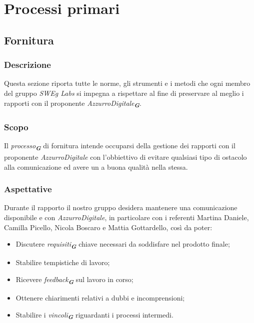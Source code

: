 

\section{Processi primari}
\label{sec:processi_primari}

\subsection{Fornitura}

\subsubsection{Descrizione}
Questa sezione riporta tutte le norme, gli strumenti e i metodi che ogni membro del gruppo \emph{SWEg Labs} si impegna a rispettare al fine di preservare al meglio i rapporti con il proponente \emph{AzzurroDigitale}\textsubscript{\textit{\textbf{G}}}.

\subsubsection{Scopo}
Il \emph{processo}\textsubscript{\textit{\textbf{G}}} di fornitura intende occuparsi della gestione dei rapporti con il proponente \emph{AzzurroDigitale} con l’obbiettivo di evitare qualsiasi tipo di ostacolo alla comunicazione ed avere un a buona qualità nella stessa.

\subsubsection{Aspettative}
Durante il rapporto il nostro gruppo desidera mantenere una comunicazione disponibile e con \emph{AzzurroDigitale}, in particolare con i referenti Martina Daniele, Camilla Picello, Nicola Boscaro e Mattia Gottardello, così da poter:
\begin{itemize}
    \item Discutere \emph{requisiti}\textsubscript{\textit{\textbf{G}}} chiave necessari da soddisfare nel prodotto finale;
    \item Stabilire tempistiche di lavoro;
    \item Ricevere \emph{feedback}\textsubscript{\textit{\textbf{G}}} sul lavoro in corso;
    \item Ottenere chiarimenti relativi a dubbi e incomprensioni;
    \item Stabilire i \emph{vincoli}\textsubscript{\textit{\textbf{G}}} riguardanti i processi intermedi.
\end{itemize}

